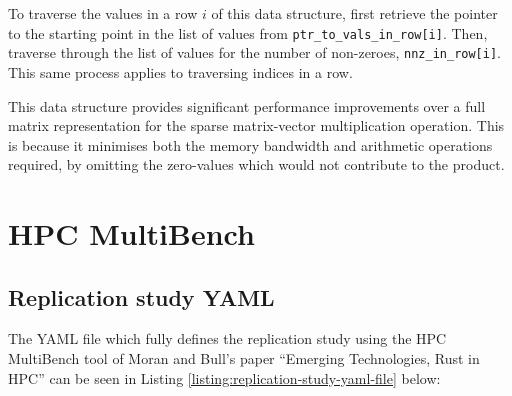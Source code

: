 To traverse the values in a row $i$ of this data structure, first retrieve the pointer to the starting point in the list of values from \texttt{ptr\_to\_vals\_in\_row[i]}. Then, traverse through the list of values for the number of non-zeroes, \texttt{nnz\_in\_row[i]}. This same process applies to traversing indices in a row.

This data structure provides significant performance improvements over a full matrix representation for the sparse matrix-vector multiplication operation. This is because it minimises both the memory bandwidth and arithmetic operations required, by omitting the zero-values which would not contribute to the product.









\chapter{HPC MultiBench}
\label{ch:tooling-appendix}

\section{Replication study YAML}
\label{sec:tooling-replication-yaml}

The YAML file which fully defines the replication study using the HPC MultiBench tool of Moran and Bull's paper ``Emerging Technologies, Rust in HPC'' \cite{moranEmergingTechnologiesRust2023} can be seen in Listing \ref{listing:replication-study-yaml-file} below:

